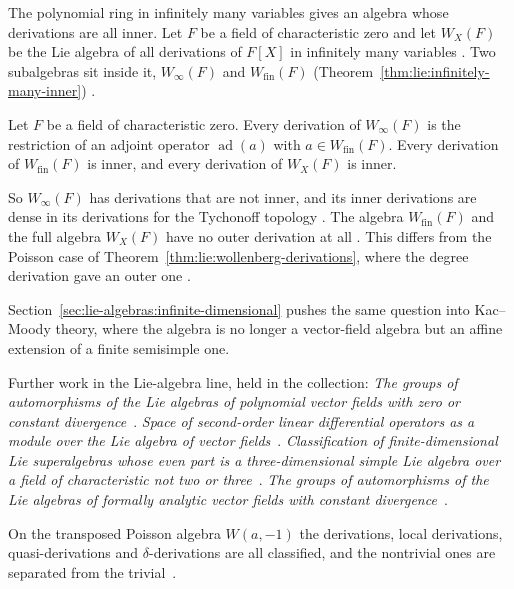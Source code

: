 The polynomial ring in infinitely many variables gives an algebra whose
derivations are all inner. Let $F$ be a field of characteristic zero and let
$W_X(F)$ be the Lie algebra of all derivations of $F[X]$ in infinitely many
variables \cite[p.~1]{BezushchakKashuba2025}. Two subalgebras sit inside it,
$W_\infty(F)$ and $W_{\mathrm{fin}}(F)$ (Theorem~\ref{thm:lie:infinitely-many-inner}) \cite[p.~2]{BezushchakKashuba2025}.

\begin{theorem}\label{thm:lie:infinitely-many-inner}
Let $F$ be a field of characteristic zero. Every derivation of $W_\infty(F)$ is
the restriction of an adjoint operator $\operatorname{ad}(a)$ with
$a\in W_{\mathrm{fin}}(F)$. Every derivation of $W_{\mathrm{fin}}(F)$ is inner,
and every derivation of $W_X(F)$ is inner.
\end{theorem}

So $W_\infty(F)$ has derivations that are not inner, and its inner derivations
are dense in its derivations for the Tychonoff topology
\cite[p.~2]{BezushchakKashuba2025}. The algebra $W_{\mathrm{fin}}(F)$ and the
full algebra $W_X(F)$ have no outer derivation at all
\cite[p.~2]{BezushchakKashuba2025}. This differs from the Poisson case of
Theorem~\ref{thm:lie:wollenberg-derivations}, where the degree derivation gave
an outer one \cite[Lemma~1, p.~316]{Wollenberg1969}.

Section~\ref{sec:lie-algebras:infinite-dimensional}
pushes the same question into Kac--Moody theory, where the algebra is no
longer a vector-field algebra but an affine extension of a finite
semisimple one.

Further work in the Lie-algebra line, held in the collection:
\noindent\emph{The groups of automorphisms of the Lie algebras of polynomial vector fields with zero or constant divergence}~\cite{LibTheGroupsOfAutomorphisms2017}.
\noindent\emph{Space of second-order linear differential operators as a module over the Lie algebra of vector fields}~\cite{LibSpaceOfSecondOrder1997}.
\noindent\emph{Classification of finite-dimensional Lie superalgebras whose even part is a three-dimensional simple Lie algebra over a field of characteristic not two or three}~\cite{LibClassificationOfFiniteDimensional2019}.
\noindent\emph{The groups of automorphisms of the Lie algebras of formally analytic vector fields with constant divergence}~\cite{LibTheGroupsOfAutomorphisms2014}.

On the transposed Poisson algebra $W(a,-1)$ the derivations, local derivations, quasi-derivations and $\delta$-derivations are all classified, and the nontrivial ones are separated from the trivial~\cite{WlTransposedPoissonStructure2026}.


